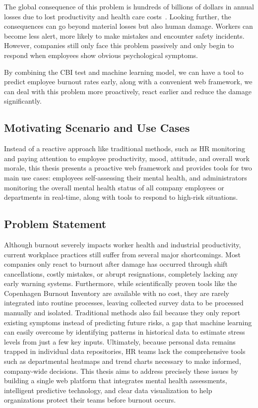 \documentclass[12pt,a4paper]{article}
\begin{document}
The global consequence of this problem is hundreds of billions of dollars in annual losses due to lost productivity and health care costs~\cite{gallup2024}. Looking further, the consequences can go beyond material losses but also human damage. Workers can become less alert, more likely to make mistakes and encounter safety incidents. However, companies still only face this problem passively and only begin to respond when employees show obvious psychological symptoms.

By combining the CBI test and machine learning model, we can have a tool to predict employee burnout rates early, along with a convenient web framework, we can deal with this problem more proactively, react earlier and reduce the damage significantly.

\subsection{Motivating Scenario and Use Cases}

Instead of a reactive approach like traditional methods, such as HR monitoring and paying attention to employee productivity, mood, attitude, and overall work morale, this thesis presents a proactive web framework and provides tools for two main use cases: employees self-assessing their mental health, and administrators monitoring the overall mental health status of all company employees or departments in real-time, along with tools to respond to high-risk situations.

\subsection{Problem Statement}

Although burnout severely impacts worker health and industrial productivity, current workplace practices still suffer from several major shortcomings. Most companies only react to burnout after damage has occurred through shift cancellations, costly mistakes, or abrupt resignations, completely lacking any early warning systems. Furthermore, while scientifically proven tools like the Copenhagen Burnout Inventory are available with no cost, they are rarely integrated into routine processes, leaving collected survey data to be processed manually and isolated. Traditional methods also fail because they only report existing symptoms instead of predicting future risks, a gap that machine learning can easily overcome by identifying patterns in historical data to estimate stress levels from just a few key inputs. Ultimately, because personal data remains trapped in individual data repositories, HR teams lack the comprehensive tools such as departmental heatmaps and trend charts necessary to make informed, company-wide decisions. This thesis aims to address precisely these issues by building a single web platform that integrates mental health assessments, intelligent predictive technology, and clear data visualization to help organizations protect their teams before burnout occurs.
\end{document}
